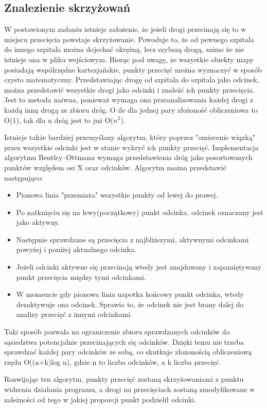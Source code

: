 \documentclass[10pt,a4paper]{article}
\begin{document}
\subsection{Znalezienie skrzyżowań}

W postawionym zadaniu istnieje założenie, że jeżeli drogi przecinają się to w miejscu przecięcia powstaje skrzyżowanie.
Powoduje to, że od pewnego szpitala do innego szpitala można dojechać okrężną, lecz szybszą drogą, mimo że nie istnieje ona w pliku wejściowym.
Biorąc pod uwagę, że wszystkie obiekty mapy posiadają współrzędne kartezjańskie, punkty przecięć można wyznaczyć w sposób czysto matematyczny.
Przedstawiając drogę od szpitala do szpitala jako odcinek, można przedstawić wszystkie drogi jako odcinki i znaleźć ich punkty przecięcia.
Jest to metoda naiwna, ponieważ wymaga ona przeanalizowania każdej drogi z każdą inną drogą ze zbioru dróg.
O ile dla jednej pary złożoność obliczeniowa to O(1), tak dla n dróg jest to już O($n^2$).

Istnieje także bardziej przemyślany algorytm, który poprzez "omiecenie wiązką" przez wszystkie odcinki jest w stanie wykryć ich punkty przecięć.
Implementacja algorytmu Bentley–Ottmann wymaga przedstawienia dróg jako posortowanych punktów względem osi X oraz odcinków. Algorytm można przedstawić następująco:
\begin{itemize}
    \item Pionowa linia "przemiata" wszystkie punkty od lewej do prawej.
    \item Po natknięciu się na lewy(początkowy) punkt odcinka, odcinek oznaczany jest jako aktywny.
    \item Następnie sprawdzane są przecięcia z najbliższymi, aktywnymi odcinkami powyżej i poniżej aktualnego odcinka.
    \item Jeżeli odcinki aktywne się przecinają wtedy jest znajdowany i zapamiętywany punkt przecięcia między tymi odcinkami.
    \item W momencie gdy pionowa linia napotka końcowy punkt odcinka, wtedy dezaktywuje ona odcinek. Sprawia to, że odcinek nie jest brany dalej do analizy przecięć z innymi odcinkami.
\end{itemize}
Taki sposób pozwala na ograniczenie zbioru sprawdzanych odcinków do sąsiedztwa potencjalnie przecinających się odcinków.
Dzięki temu nie trzeba sprawdzać każdej pary odcinków ze sobą, co skutkuje złożonością obliczeniową rzędu O((n+k)log n), gdzie n to liczba odcinków, a k liczba przecięć.

Rozwijając ten algorytm, punkty przecięć zostaną skrzyżowaniami z punktu widzenia działania programu, a drogi na przecięciach zostaną zmodyfikowane w zależności od tego w jakiej proporcji punkt podzielił odcinki.
\end{document}
